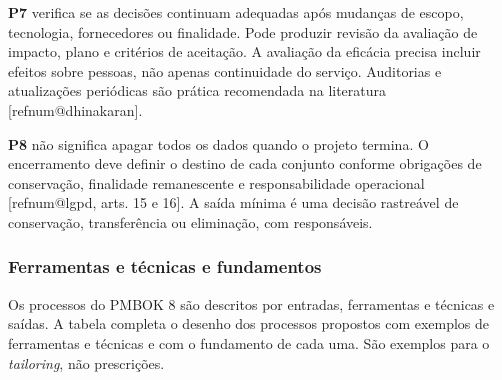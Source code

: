 \documentclass[12pt,a4paper,article,oneside,english,brazil]{abntex2}
\makeatletter
\newcommand{\refnum}[1]{\csname refnum@#1\endcsname}
\makeatother
\begin{document}
\textbf{P7} verifica se as decisões continuam adequadas após mudanças de escopo, tecnologia, fornecedores ou finalidade. Pode produzir revisão da avaliação de impacto, plano e critérios de aceitação. A avaliação da eficácia precisa incluir efeitos sobre pessoas, não apenas continuidade do serviço. Auditorias e atualizações periódicas são prática recomendada na literatura [\refnum{dhinakaran}].

\textbf{P8} não significa apagar todos os dados quando o projeto termina. O encerramento deve definir o destino de cada conjunto conforme obrigações de conservação, finalidade remanescente e responsabilidade operacional [\refnum{lgpd}, arts. 15 e 16]. A saída mínima é uma decisão rastreável de conservação, transferência ou eliminação, com responsáveis.
\subsubsection{Ferramentas e técnicas e fundamentos}

Os processos do PMBOK 8 são descritos por entradas, ferramentas e técnicas e saídas. A tabela completa o desenho dos processos propostos com exemplos de ferramentas e técnicas e com o fundamento de cada uma. São exemplos para o \textit{tailoring}, não prescrições.
\end{document}
